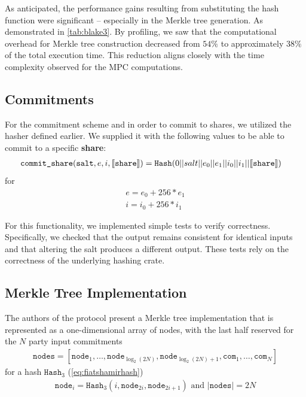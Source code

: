 \documentclass[11pt]{report}
\theoremstyle{definition}
\theoremstyle{plain}
\begin{document}
As anticipated, the performance gains resulting from substituting the hash function were significant -- especially in the Merkle tree generation. As demonstrated in \autoref{tab:blake3}. By profiling, we saw that the computational overhead for Merkle tree construction decreased from $54\%$ to approximately $38\%$ of the total execution time. This reduction aligns closely with the time complexity observed for the MPC computations.

\subsection{Commitments}
For the commitment scheme and in order to commit to shares, we utilized the hasher defined earlier. We supplied it with the following values to be able to commit to a specific \textbf{share}:
\begin{align*}
   & \texttt{commit\_share}(\texttt{salt}, e, i, \llbracket \texttt{share} \rrbracket) = \texttt{Hash}(0 || salt || e_0 || e_1 || i_0 || i_1 || \llbracket \texttt{share} \rrbracket)
\end{align*}
for
\begin{align*}
  e = e_0 + 256 * e_1 \\
  i = i_0 + 256 * i_1
\end{align*}

For this functionality, we implemented simple tests to verify correctness. Specifically, we checked that the output remains consistent for identical inputs and that altering the salt produces a different output. These tests rely on the correctness of the underlying hashing crate.

\subsection{Merkle Tree Implementation}\label{sub:merkle_tree_impl}

The authors of the protocol present a Merkle tree implementation that is represented as a one-dimensional array of nodes, with the last half reserved for the $N$ party input commitments
\begin{align*}
  \texttt{nodes} = [\texttt{node}_1, \dots, \texttt{node}_{\log_2(2N)}, \texttt{node}_{\log_2(2N)+1}, \texttt{com}_1, \dots, \texttt{com}_N]
\end{align*}
for a hash $\texttt{Hash}_3$ (\autoref{eq:fiatshamirhash})
\begin{align*}
  \texttt{node}_i = \texttt{Hash}_3(i, \texttt{node}_{2i}, \texttt{node}_{2i + 1})\text{ and } |\texttt{nodes}| = 2N
\end{align*}
\end{document}
